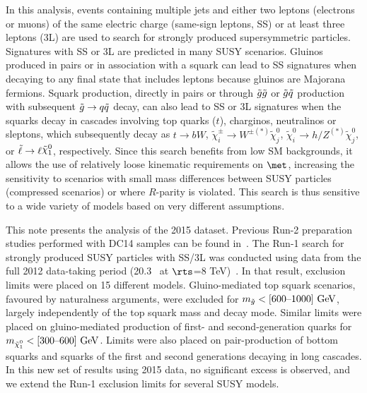 In this analysis, events containing multiple jets and either two leptons (electrons or muons) 
of the same electric charge (same-sign leptons, SS) or at least three leptons (3L) 
are used to search for strongly produced 
supersymmetric particles. Signatures with SS or 3L are predicted in many SUSY scenarios.
Gluinos produced in pairs or in association with a squark  
can lead to SS signatures when decaying to any final state that includes leptons because gluinos are Majorana fermions.
Squark production, directly in pairs
or through $\tilde{g} \tilde{g}$ or $\tilde{g} \tilde q$  production with 
subsequent $\tilde{g} \to q\tilde q$ decay, can also lead to
SS or 3L signatures when the squarks decay in cascades involving top quarks ($t$), charginos, 
neutralinos or sleptons, which subsequently decay as $t\to bW$,
$\tilde\chi^{\pm}_i\to W^{\pm (*)}\tilde\chi^0_j$,
$\tilde\chi^0_i\to h/Z^{(*)} \tilde\chi^0_j$, or
$\tilde\ell\to \ell\ninoone$, respectively.
Since this search benefits from low 
SM backgrounds, it allows the use of relatively loose kinematic
requirements on
$\met$, increasing the sensitivity to scenarios with
small mass differences between SUSY particles (compressed scenarios)
or where $R$-parity is violated. This search is thus sensitive to a wide variety 
of models based on very different assumptions.

This note presents the analysis of the 2015 dataset. 
Previous Run-2 preparation studies performed with DC14 samples can be found in~\cite{NoteDC14}. 
The Run-1 search for strongly produced SUSY particles with SS/3L 
was conducted using data from the full 2012 data-taking period (20.3 \ifb\ at $\rts$=8 TeV)~\cite{paperSS3L,noteSS3L}. 
In that result, exclusion limits were placed on 15 different models.
Gluino-mediated top squark scenarios, favoured by naturalness arguments, were excluded
for $m_{\gluino}<[600\mbox{--}1000] \GeV$, largely independently of the top
squark mass and decay mode. Similar limits were placed on gluino-mediated production of
first- and second-generation quarks for $m_{\ninoone}<[300\mbox{--}600] \GeV$. Limits were
also placed on pair-production  of bottom squarks and squarks of the first
and second generations decaying in long cascades. 
In this new set of results using 2015 data, no significant excess is observed, 
and we extend the Run-1 exclusion limits for several SUSY models. 


